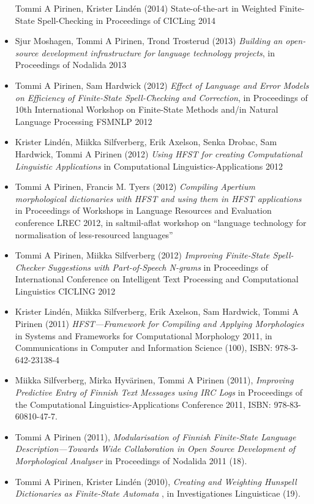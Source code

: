 \documentclass[a4paper]{article}
\begin{document}
\begin{itemize}
Tommi A Pirinen, Krister Lindén (2014) State-of-the-art in Weighted Finite-State Spell-Checking in Proceedings of CICLing 2014
\item Sjur Moshagen, Tommi A Pirinen, Trond Trosterud (2013) \textit{Building an open-source development infrastructure for language technology projects}, in Proceedings of Nodalida 2013
\item Tommi A Pirinen, Sam Hardwick (2012) \textit{Effect of Language and Error Models on Efficiency of Finite-State Spell-Checking and Correction}, in Proceedings of 10th International Workshop on Finite-State Methods and/in Natural Language Processing FSMNLP 2012
\item Krister Lindén, Miikka Silfverberg, Erik Axelson, Senka Drobac, Sam Hardwick, Tommi A Pirinen (2012) \textit{Using HFST for creating Computational Linguistic Applications} in Computational Linguistics-Applications 2012
\item Tommi A Pirinen, Francis M. Tyers (2012) \textit{Compiling Apertium morphological dictionaries with HFST and using them in HFST applications} in Proceedings of Workshops in Language Resources and Evaluation conference LREC 2012, in saltmil-aflat workshop on “language technology for normalisation of less-resourced languages”
\item Tommi A Pirinen, Miikka Silfverberg (2012) \textit{Improving Finite-State Spell-Checker Suggestions with Part-of-Speech N-grams} in Proceedings of International Conference on Intelligent Text Processing and Computational Linguistics CICLING 2012
\item Krister Lindén, Miikka Silfverberg, Erik Axelson, Sam Hardwick, Tommi A Pirinen (2011) \textit{HFST—Framework for Compiling and Applying Morphologies} in Systems and Frameworks for Computational Morphology 2011, in Communications in Computer and Information Science (100), ISBN: 978-3-642-23138-4
\item Miikka Silfverberg, Mirka Hyvärinen, Tommi A Pirinen (2011), \textit{Improving Predictive Entry of Finnish Text Messages using IRC Logs} in Proceedings of the Computational Linguistics-Applications Conference 2011, ISBN: 978-83-60810-47-7.
\item Tommi A Pirinen (2011), \textit{Modularisation of Finnish Finite-State Language Descrip\-tion—Towards Wide Collaboration in Open Source Development of Morphological Analyser} in Proceedings of Nodalida 2011 (18).
\item Tommi A Pirinen, Krister Lindén (2010), \textit{Creating and Weighting Hunspell Dictionaries as Finite-State Automata} , in Investigationes Linguisticae (19).

\end{itemize}
\end{document}
